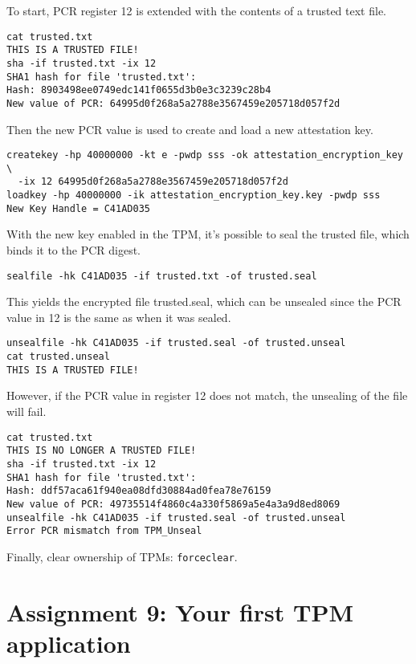 \documentclass[10pt]{article}
\newcommand{\command}[1]{\texttt{#1}}
\begin{document}
    To start, PCR register 12 is extended with the contents of a trusted text
    file.

\begin{verbatim}
cat trusted.txt
THIS IS A TRUSTED FILE!
sha -if trusted.txt -ix 12
SHA1 hash for file 'trusted.txt':
Hash: 8903498ee0749edc141f0655d3b0e3c3239c28b4
New value of PCR: 64995d0f268a5a2788e3567459e205718d057f2d
\end{verbatim}

    Then the new PCR value is used to create and load  a new attestation key.

\begin{verbatim}
createkey -hp 40000000 -kt e -pwdp sss -ok attestation_encryption_key \
  -ix 12 64995d0f268a5a2788e3567459e205718d057f2d
loadkey -hp 40000000 -ik attestation_encryption_key.key -pwdp sss
New Key Handle = C41AD035
\end{verbatim}

    With the new key enabled in the TPM, it's possible to seal the trusted
    file, which binds it to the PCR digest.

\begin{verbatim}
sealfile -hk C41AD035 -if trusted.txt -of trusted.seal
\end{verbatim}

    This yields the encrypted file trusted.seal, which can be unsealed since
    the PCR value in 12 is the same as when it was sealed.

\begin{verbatim}
unsealfile -hk C41AD035 -if trusted.seal -of trusted.unseal
cat trusted.unseal
THIS IS A TRUSTED FILE!
\end{verbatim}

    However, if the PCR value in register 12 does not match, the unsealing of
    the file will fail.

\begin{verbatim}
cat trusted.txt
THIS IS NO LONGER A TRUSTED FILE!
sha -if trusted.txt -ix 12
SHA1 hash for file 'trusted.txt':
Hash: ddf57aca61f940ea08dfd30884ad0fea78e76159
New value of PCR: 49735514f4860c4a330f5869a5e4a3a9d8ed8069
unsealfile -hk C41AD035 -if trusted.seal -of trusted.unseal
Error PCR mismatch from TPM_Unseal
\end{verbatim}

Finally, clear ownership of TPMs: \command{forceclear}.

\section{Assignment 9: Your first TPM application}
\end{document}
